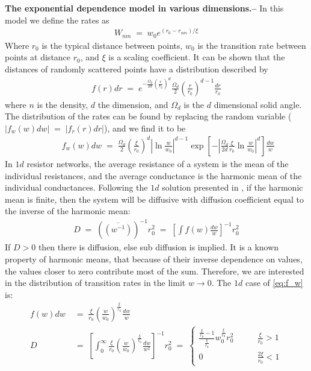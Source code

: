 \documentclass[onecolumn,fleqn,notitlepage,secnumarabic]{revtex4}
\begin{document}
{ \bf The exponential dependence model in various dimensions.--} In this model we define the rates as 
\begin{align} \label{eq:exp_dep}
  W_{nm}\;=\; w_0 e^{(r_0-r_{nm})/ \xi}
\end{align}
Where $r_0$ is the typical distance between points, $w_0$ is the transition rate between points at distance $r_0$, and $\xi$ is a scaling coefficient. It can be shown that the distances of randomly scattered points have a distribution described by 
\begin{align}
  f(r)dr \;=\; e^{-\frac{\Omega_d}{2d} \left(\frac{r}{r_0}\right)^d} \frac{\Omega_d}{2} \left(\frac{r}{r_0}\right)^{d-1}\frac{dr}{r_0}
\end{align}
where $n$ is the density, $d$ the dimension, and $\Omega_d$ is the $d$ dimensional solid angle. The distribution of the rates can be found by replacing the random variable ($|f_w(w)dw| \;=\; |f_r(r)dr|$), and we find it to be 
\begin{align}\label{eq:f_w}
 &\qquad f_w(w)dw \;=\; \frac{\Omega_d}{2}\left(\frac{\xi}{r_0}\right)^d\left|\ln \frac{w}{w_0}\right|^{d-1} \exp\left[-\left|\frac{\Omega_d}{2d}\frac{\xi}{r_0}\ln \frac{w}{w_0}\right|^d\right] \frac{dw}{w}
\end{align}
In $1d$ resistor networks, the average resistance of a system is the mean of the individual resistances, and the average conductance is the harmonic mean of the individual conductances. Following the $1d$ solution presented in \cite{Alexander:1981:RMP}, if the harmonic mean is finite, then the system will be diffusive with diffusion coefficient equal to the inverse of the harmonic mean:
\begin{align}
    D \;=\; \left(\overline{(w^{-1})}\right)^{-1}r_0^2 \;=\; \left[\int f(w) \frac{dw}{w}\right]^{-1} r_0^2
\end{align}
If $D>0$ then there is diffusion, else sub diffusion is implied. It is a known property of harmonic means, that because of their inverse dependence on values, the values closer to zero contribute most of the sum. Therefore, we are interested in the distribution of transition rates in the limit $w\rightarrow 0$. The $1d$ case of \eqref{eq:f_w} is:
\begin{align}\label{eq:1d_D}
f(w)dw &\;=\; \frac{\xi}{r_0} \left(\frac{w}{w_0}\right)^{\frac{\xi}{r_0} }\frac{dw}{w} \\
D &\;=\; \left[\int_0^\infty  \frac{\xi}{r_0} \left(\frac{w}{w_0}\right)^{\frac{\xi}{r_0} } \frac{dw}{w^2}\right]^{-1} r_0^2 \;=\; 
\begin{cases}
    \frac{\frac{\xi}{r_0} -1}{\frac{\xi}{r_0}}w_0^{\frac{\xi}{r_0}} r_0^2 &\qquad \frac{\xi}{r_0} > 1\\
    0  &\qquad \frac{2\xi}{r_0} < 1
\end{cases}
\end{align}
\end{document}
